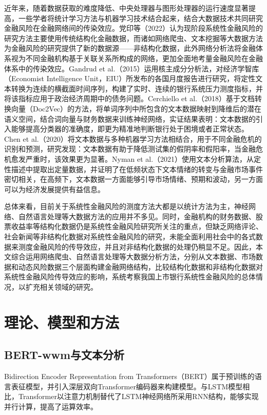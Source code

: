 \documentclass[lang=cn]{elegantpaper}
\begin{document}
近年来，随着数据获取的难度降低、中央处理器与图形处理器的运行速度显著提高，一些学者将统计学习方法与机器学习技术结合起来，结合大数据技术共同研究金融风险在金融网络间的传染效应。党印等（2022）\cite{19}认为现阶段系统性金融风险的研究方法主要使用传统结构化金融数据，而诸如网络爬虫、文本挖掘等大数据方法为金融风险的研究提供了新的数据源——非结构化数据，此外网络分析法将金融体系视为不同金融机构基于关联关系所构成的网络，更加全面地考量金融风险在金融体系中的传染效应。Gandrud et al.（2015）\cite{20}运用核主成分分析法，对经济学智库（Economist Intelligence Unit，EIU）所发布的各国月度报告进行研究，将定性文本转换为连续的横截面时间序列，构建了实时、连续的银行系统压力测度指标，并将该指标应用于政治经济周期中的债务问题。Cerchiello et al.（2018）\cite{21}基于文档转换向量（Doc2Vec）的方法，将单词序列中所包含的文本数据映射到降维后的潜在语义空间，结合词向量与财务数据来训练神经网络，实证结果表明：文本数据的引入能够提高分类器的准确度，即更为精准地判断银行处于困境或者正常状态。Chen et al.（2020）\cite{22}将文本数据与多种机器学习方法相结合，用于不同金融危机的识别和预测，研究发现：文本数据有助于降低测试集的假阴率和假阳率，当金融危机愈发严重时，该效果更为显著。Nyman et al.（2021）\cite{23}使用文本分析算法，从定性描述中提取出定量数据，并证明了在低频状态下文本情绪的转变与金融市场事件密切相关，在高频下，文本数据一方面能够引导市场情绪、预期和波动，另一方面可以为经济发展提供有益信息。

总体来看，目前关于系统性金融风险的测度方法大都是以统计方法为主，神经网络、自然语言处理等大数据方法的应用并不多见。同时，金融机构的财务数据、股票收益率等结构化数据仍是系统性金融风险研究所关注的重点，但缺乏网络评论、社会新闻等非结构化数据对系统性金融风险的研究，未能全面利用社会中的各式数据来测度金融风险的传导效应，并且对非结构化数据的处理仍稍显不足。因此，本文综合运用网络爬虫、自然语言处理等大数据分析方法，分别从文本数据、市场数据和动态风险数据三个层面构建金融网络结构，比较结构化数据和非结构化数据对系统性金融风险传导效应的影响，系统考察我国上市银行系统性金融风险的总体情况，以扩充相关领域的研究。

\section{理论、模型和方法}
\subsection{BERT-wwm与文本分析}
Bidirection Encoder Representation from Transformers（BERT）属于预训练的语言表征模型，并引入深层双向Transformer编码器来构建模型。与LSTM模型相比，Transformer以注意力机制替代了LSTM神经网络所采用RNN结构，能够实现并行计算，提高了运算效率。
\end{document}

